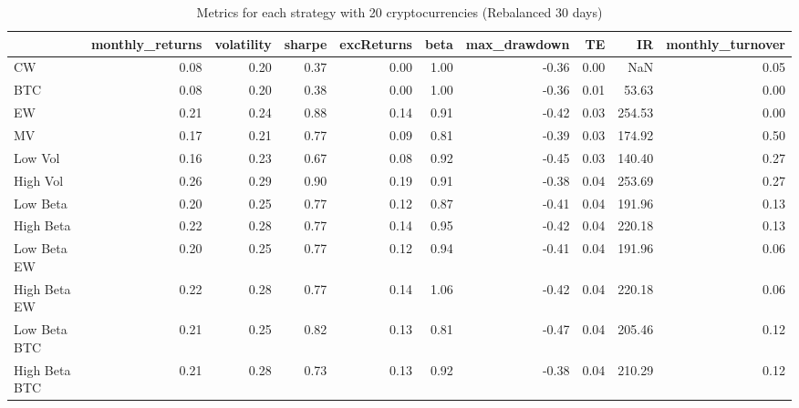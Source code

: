 \begin{table}
\centering
\caption{Metrics for each strategy with 20 cryptocurrencies (Rebalanced 30 days)}
\label{metrics20_30}
\begin{tabular}{lrrrrrrrrr}
\toprule
{} &  monthly\_returns &  volatility &  sharpe &  excReturns &  beta &  max\_drawdown &   TE &     IR &  monthly\_turnover \\
\midrule
CW            &             0.08 &        0.20 &    0.37 &        0.00 &  1.00 &         -0.36 & 0.00 &    NaN &              0.05 \\
BTC           &             0.08 &        0.20 &    0.38 &        0.00 &  1.00 &         -0.36 & 0.01 &  53.63 &              0.00 \\
EW            &             0.21 &        0.24 &    0.88 &        0.14 &  0.91 &         -0.42 & 0.03 & 254.53 &              0.00 \\
MV            &             0.17 &        0.21 &    0.77 &        0.09 &  0.81 &         -0.39 & 0.03 & 174.92 &              0.50 \\
Low Vol       &             0.16 &        0.23 &    0.67 &        0.08 &  0.92 &         -0.45 & 0.03 & 140.40 &              0.27 \\
High Vol      &             0.26 &        0.29 &    0.90 &        0.19 &  0.91 &         -0.38 & 0.04 & 253.69 &              0.27 \\
Low Beta      &             0.20 &        0.25 &    0.77 &        0.12 &  0.87 &         -0.41 & 0.04 & 191.96 &              0.13 \\
High Beta     &             0.22 &        0.28 &    0.77 &        0.14 &  0.95 &         -0.42 & 0.04 & 220.18 &              0.13 \\
Low Beta EW   &             0.20 &        0.25 &    0.77 &        0.12 &  0.94 &         -0.41 & 0.04 & 191.96 &              0.06 \\
High Beta EW  &             0.22 &        0.28 &    0.77 &        0.14 &  1.06 &         -0.42 & 0.04 & 220.18 &              0.06 \\
Low Beta BTC  &             0.21 &        0.25 &    0.82 &        0.13 &  0.81 &         -0.47 & 0.04 & 205.46 &              0.12 \\
High Beta BTC &             0.21 &        0.28 &    0.73 &        0.13 &  0.92 &         -0.38 & 0.04 & 210.29 &              0.12 \\
\bottomrule
\end{tabular}
\end{table}
